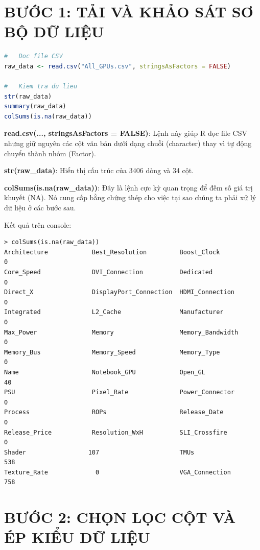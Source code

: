 \documentclass[12pt,a4paper]{article}
\begin{document}
\section*{BƯỚC 1: TẢI VÀ KHẢO SÁT SƠ BỘ DỮ LIỆU}

\begin{lstlisting}[language=R]
#   Doc file CSV
raw_data <- read.csv("All_GPUs.csv", stringsAsFactors = FALSE)

#   Kiem tra du lieu
str(raw_data)
summary(raw_data)
colSums(is.na(raw_data))
\end{lstlisting}

\textbf{read.csv(..., stringsAsFactors = FALSE)}: Lệnh này giúp R đọc file CSV nhưng giữ nguyên các cột văn bản dưới dạng chuỗi (character) thay vì tự động chuyển thành nhóm (Factor).

\textbf{str(raw\_data)}: Hiển thị cấu trúc của 3406 dòng và 34 cột.

\textbf{colSums(is.na(raw\_data))}: Đây là lệnh cực kỳ quan trọng để đếm số giá trị khuyết (NA). Nó cung cấp bằng chứng thép cho việc tại sao chúng ta phải xử lý dữ liệu ở các bước sau.

Kết quả trên console:
\begin{lstlisting}[style=console]
> colSums(is.na(raw_data))
Architecture            Best_Resolution         Boost_Clock             0
Core_Speed              DVI_Connection          Dedicated               0
Direct_X                DisplayPort_Connection  HDMI_Connection         0
Integrated              L2_Cache                Manufacturer            0
Max_Power               Memory                  Memory_Bandwidth        0
Memory_Bus              Memory_Speed            Memory_Type             0
Name                    Notebook_GPU            Open_GL                40
PSU                     Pixel_Rate              Power_Connector         0
Process                 ROPs                    Release_Date            0
Release_Price           Resolution_WxH          SLI_Crossfire           0
Shader                 107                      TMUs                  538
Texture_Rate             0                      VGA_Connection        758
\end{lstlisting}

\section*{BƯỚC 2: CHỌN LỌC CỘT VÀ ÉP KIỂU DỮ LIỆU}
\end{document}
